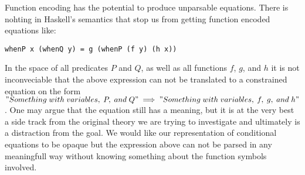 Function encoding has the potential to produce unparsable equations.
There is nohting in Haskell's semantics that stop us from getting function
encoded equations like:
\begin{verbatim}whenP x (whenQ y) = g (whenP (f y) (h x))\end{verbatim}
In the space of all predicates $P$ and $Q$, as well as all functions $f$, $g$, and $h$ it
is not inconveciable that the above expression can not be translated to a constrained
equation on the form\\$"Something\;with\;variables,\;P,\;and\;Q"\implies "Something\;with\;variables,\;f,\;g,\;and\;h"$.
One may argue that the equation still has a meaning, but it is at the very best a side track
from the original theory we are trying to investigate and ultimately is a distraction from the goal.
We would like our representation of conditional equations to be opaque but the expression above
can not be parsed in any meaningfull way without knowing something about the function symbols involved.
